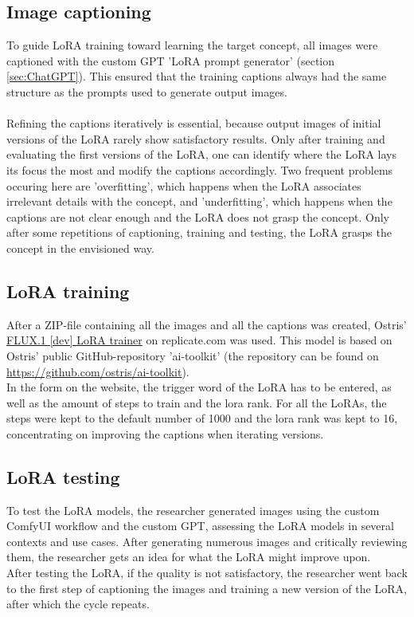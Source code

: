 \subsection{Image captioning}
To guide LoRA training toward learning the target concept, all images were captioned with the custom GPT 'LoRA prompt generator' (section \ref{sec:ChatGPT}). This ensured that the training captions always had the same structure as the prompts used to generate output images.\\
\\
Refining the captions iteratively is essential, because output images of initial versions of the LoRA rarely show satisfactory results. Only after training and evaluating the first versions of the LoRA, one can identify where the LoRA lays its focus the most and modify the captions accordingly. Two frequent problems occuring here are 'overfitting', which happens when the LoRA associates irrelevant details with the concept, and 'underfitting', which happens when the captions are not clear enough and the LoRA does not grasp the concept. Only after some repetitions of captioning, training and testing, the LoRA grasps the concept in the envisioned way.

\subsection{LoRA training}
After a ZIP-file containing all the images and all the captions was created, Ostris' \href{https://replicate.com/ostris/flux-dev-lora-trainer/train}{FLUX.1 [dev] LoRA trainer} on replicate.com was used. This model is based on Ostris' public GitHub-repository 'ai-toolkit' (the repository can be found on \href{https://github.com/ostris/ai-toolkit}{https://github.com/ostris/ai-toolkit}).\\
In the form on the website, the trigger word of the LoRA has to be entered, as well as the amount of steps to train and the lora rank. For all the LoRAs, the steps were kept to the default number of 1000 and the lora rank was kept to 16, concentrating on improving the captions when iterating versions.

\subsection{LoRA testing}
To test the LoRA models, the researcher generated images using the custom ComfyUI workflow and the custom GPT, assessing the LoRA models in several contexts and use cases. After generating numerous images and critically reviewing them, the researcher gets an idea for what the LoRA might improve upon.\\
After testing the LoRA, if the quality is not satisfactory, the researcher went back to the first step of captioning the images and training a new version of the LoRA, after which the cycle repeats.

